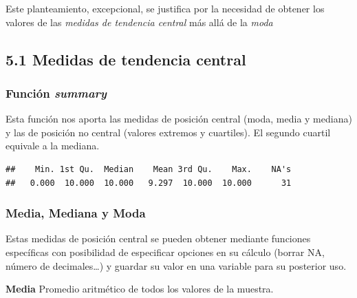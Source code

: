 \documentclass[
]{article}
\newenvironment{Shaded}{\begin{snugshade}}{\end{snugshade}}
\newcommand{\AttributeTok}[1]{\textcolor[rgb]{0.13,0.29,0.53}{#1}}
\newcommand{\ConstantTok}[1]{\textcolor[rgb]{0.56,0.35,0.01}{#1}}
\newcommand{\DecValTok}[1]{\textcolor[rgb]{0.00,0.00,0.81}{#1}}
\newcommand{\FunctionTok}[1]{\textcolor[rgb]{0.13,0.29,0.53}{\textbf{#1}}}
\newcommand{\NormalTok}[1]{#1}
\newcommand{\OtherTok}[1]{\textcolor[rgb]{0.56,0.35,0.01}{#1}}
\newcommand{\SpecialCharTok}[1]{\textcolor[rgb]{0.81,0.36,0.00}{\textbf{#1}}}
\begin{document}
Este planteamiento, excepcional, se justifica por la necesidad de
obtener los valores de las \emph{medidas de tendencia central} más allá
de la \emph{moda}

\hypertarget{medidas-de-tendencia-central}{%
\subsection{5.1 Medidas de tendencia
central}\label{medidas-de-tendencia-central}}

\hypertarget{funciuxf3n-summary}{%
\subsubsection{\texorpdfstring{Función
\emph{summary}}{Función summary}}\label{funciuxf3n-summary}}

Esta función nos aporta las medidas de posición central (moda, media y
mediana) y las de posición no central (valores extremos y cuartiles). El
segundo cuartil equivale a la mediana.

\begin{Shaded}
\end{Shaded}

\begin{verbatim}
##    Min. 1st Qu.  Median    Mean 3rd Qu.    Max.    NA's 
##   0.000  10.000  10.000   9.297  10.000  10.000      31
\end{verbatim}

\hypertarget{media-mediana-y-moda}{%
\subsubsection{Media, Mediana y Moda}\label{media-mediana-y-moda}}

Estas medidas de posición central se pueden obtener mediante funciones
específicas con posibilidad de especificar opciones en su cálculo
(borrar NA, número de decimales\ldots) y guardar su valor en una
variable para su posterior uso.

\textbf{Media} Promedio aritmético de todos los valores de la muestra.

\begin{Shaded}
\end{Shaded}
\end{document}
